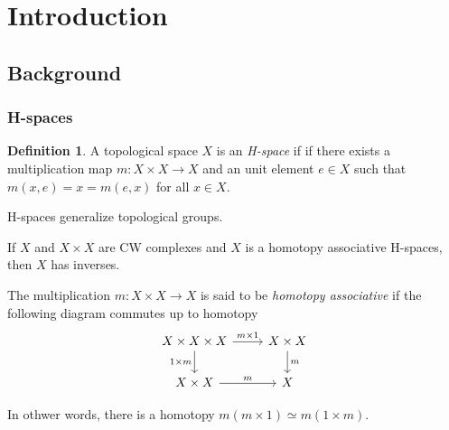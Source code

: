 \documentclass{beamer}
\theoremstyle{definition}
\newtheorem{defi}{Definition}
\begin{document}
\section{Introduction}

\subsection{Background}

\begin{frame}[fragile]
\frametitle{H-spaces}
\begin{defi}
A topological space $X$ is an \emph{H-space} if if there exists a multiplication map $m:X\times X\to X$ and an unit element $e\in X$ such that $m(x,e)=x=m(e,x)$ for all $x\in X$. %
\end{defi}\pause	
H-spaces generalize topological groups.\pause
\begin{lemma}[Sugawara]
If $X$ and $X\times X$ are CW complexes and $X$ is a homotopy associative H-spaces, then $X$ has inverses.
\end{lemma}

\end{frame}

\begin{frame}[fragile]

The multiplication $m:X\times X\to X$ is said to be \emph{homotopy associative} if the following diagram commutes up to homotopy
\[
\begin{tikzcd}
X\times X\times X\arrow[r,"m\times 1"]\arrow[d,"1\times m"']& X\times X\arrow[d,"m"]\\
X\times X\arrow[r,"m"]& X
\end{tikzcd}
\]\pause

In othwer words, there is a homotopy $m(m\times 1)\simeq m(1\times m)$.
\end{frame}
\end{document}
